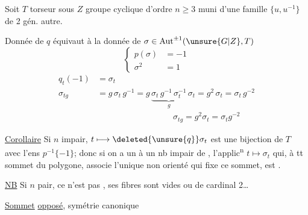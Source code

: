 Soit $T$ torseur sous $Z$ groupe cyclique d'ordre $n\geq3$ muni d'une famille $\{u,u^{-1}\}$ de 2 gén. autre.

Donnée de $q$ équivaut à la donnée de $\sigma\in\operatorname{Aut}^{\pm1}(\unsure{G|Z},T)$
\[
\left\{\begin{aligned}p(\sigma)&=-1\\ \sigma^2&=1\end{aligned}\right.
\]
\[
\begin{aligned}
q_t(-1)&=\sigma_t\\
\sigma_{tg}&=g\,\sigma_t\,g^{-1}
=g\,\underbrace{\sigma_t\,g^{-1}\,\sigma_t^{-1}}_{g}\,\sigma_t
=g^2\,\sigma_t=\sigma_t\,g^{-2}\\
&\hspace{9em}\boxed{\sigma_{tg}=g^2\sigma_t=\sigma_t g^{-2}}
\end{aligned}
\]

\uline{Corollaire} Si $n$ impair, $t\longmapsto\deleted{\unsure{q}}\sigma_t$ est une bijection de $T$ avec l'ens  $p^{-1}\{-1\}$; donc si on a un  à un nb impair de , l'applic\textsuperscript{n} $t\longmapsto\sigma_t$ qui, à tt sommet du polygone, associe l'unique  non orienté qui fixe ce sommet, est .

\uline{NB} Si $n$ pair,  ce n'est pas ,   ses fibres sont vides ou de cardinal 2\ldots


\uline{Sommet} \uline{opposé}, symétrie canonique

